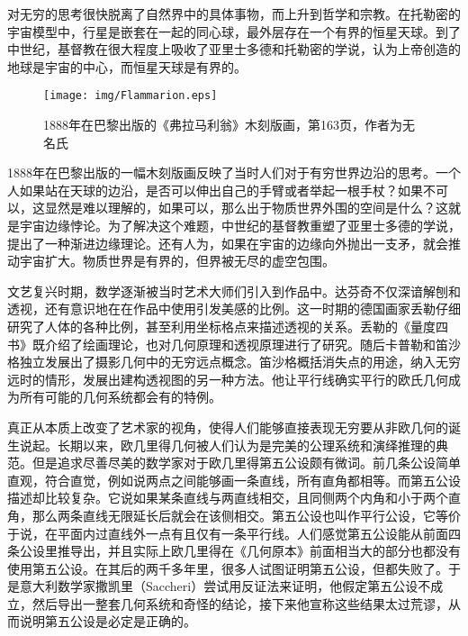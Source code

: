 \documentclass{article}
\begin{document}
对无穷的思考很快脱离了自然界中的具体事物，而上升到哲学和宗教。在托勒密的宇宙模型中，行星是嵌套在一起的同心球，最外层存在一个有界的恒星天球。到了中世纪，基督教在很大程度上吸收了亚里士多德和托勒密的学说，认为上帝创造的地球是宇宙的中心，而恒星天球是有界的。

\begin{figure}[htbp]
 \centering
 \texttt{[image: img/Flammarion.eps]}
 \captionsetup{labelformat=empty}
 \caption{1888年在巴黎出版的《弗拉马利翁》木刻版画，第163页，作者为无名氏}
 \label{fig:Flamarion-woodcut}
\end{figure}




1888年在巴黎出版的一幅木刻版画反映了当时人们对于有穷世界边沿的思考。一个人如果站在天球的边沿，是否可以伸出自己的手臂或者举起一根手杖？如果不可以，这显然是难以理解的，如果可以，那么出于物质世界外围的空间是什么？这就是宇宙边缘悖论。为了解决这个难题，中世纪的基督教重塑了亚里士多德的学说，提出了一种渐进边缘理论。还有人为，如果在宇宙的边缘向外抛出一支矛，就会推动宇宙扩大。物质世界是有界的，但界被无尽的虚空包围。

文艺复兴时期，数学逐渐被当时艺术大师们引入到作品中。达芬奇不仅深谙解刨和透视，还有意识地在在作品中使用引发美感的比例。这一时期的德国画家丢勒仔细研究了人体的各种比例，甚至利用坐标格点来描述透视的关系。丢勒的《量度四书》既介绍了绘画理论，也对几何原理和透视原理进行了研究。随后卡普勒和笛沙格独立发展出了摄影几何中的无穷远点概念。笛沙格概括消失点的用途，纳入无穷远时的情形，发展出建构透视图的另一种方法。他让平行线确实平行的欧氏几何成为所有可能的几何系统都会有的特例。

真正从本质上改变了艺术家的视角，使得人们能够直接表现无穷要从非欧几何的诞生说起。长期以来，欧几里得几何被人们认为是完美的公理系统和演绎推理的典范。但是追求尽善尽美的数学家对于欧几里得第五公设颇有微词。前几条公设简单直观，符合直觉，例如说两点之间能够画一条直线，所有直角都相等。而第五公设描述却比较复杂。它说如果某条直线与两直线相交，且同侧两个内角和小于两个直角，那么两条直线无限延长后就会在该侧相交。第五公设也叫作平行公设，它等价于说，在平面内过直线外一点有且仅有一条平行线。人们感觉第五公设能从前面四条公设里推导出，并且实际上欧几里得在《几何原本》前面相当大的部分也都没有使用第五公设。在其后的两千多年里，很多人试图证明第五公设，但都失败了。于是意大利数学家撒凯里（Saccheri）尝试用反证法来证明，他假定第五公设不成立，然后导出一整套几何系统和奇怪的结论，接下来他宣称这些结果太过荒谬，从而说明第五公设是必定是正确的。
\end{document}
